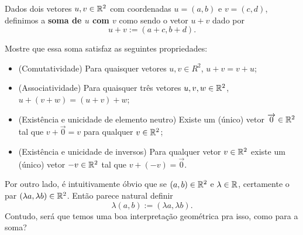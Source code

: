 \begin{df}
	Dados dois vetores $u,v\in \mathbb R^2$ com coordenadas $u=(a,b)$ e $v=(c,d)$, definimos a \textbf{soma de $u$ com $v$} como sendo o vetor $u+v$ dado por
	\[u+v:=(a+c,b+d).\]
\end{df}

\begin{exerc}
	Mostre que essa soma satisfaz as seguintes propriedades:
	\begin{itemize}
		\item (Comutatividade) Para quaisquer vetores $u,v\in R^2$, $u+v=v+u$;
		\item (Associatividade) Para quaisquer três vetores $u,v,w\in \mathbb R^2$, $u+(v+w)=(u+v)+w$;
		\item (Existência e unicidade de elemento neutro) Existe um (único) vetor $\overrightarrow{0}\in \mathbb R^2$ tal que $v+\overrightarrow{0}=v$ para qualquer $v\in \mathbb R^2$;
		\item (Existência e unicidade de inversos) Para qualquer vetor $v\in\mathbb R^2$ existe um (único) vetor $-v\in\mathbb R^2$ tal que $v+(-v)=\overrightarrow{0}$.
	\end{itemize}
\end{exerc}

Por outro lado, é intuitivamente óbvio que se $(a,b)\in\mathbb R^2$ e $\lambda\in \mathbb R$, certamente o par $(\lambda a,\lambda b)\in \mathbb R^2$. Então parece natural definir
\[\lambda(a,b):=(\lambda a,\lambda b).\] Contudo, será que temos uma boa interpretação geométrica pra isso, como para a soma?

